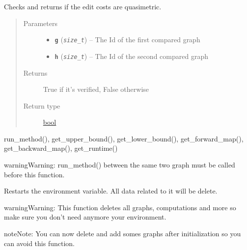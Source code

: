 \documentclass[letterpaper,10pt,english]{sphinxmanual}
\begin{document}
\begin{fulllineitems}
\label{doc:gedlibpy.quasimetric_cost}
Checks and returns if the edit costs are quasimetric.
\begin{quote}\begin{description}
\item[{Parameters}] \leavevmode\begin{itemize}
\item {} 
\textbf{\texttt{g}} (\emph{\texttt{size\_t}}) -- The Id of the first compared graph

\item {} 
\textbf{\texttt{h}} (\emph{\texttt{size\_t}}) -- The Id of the second compared graph

\end{itemize}

\item[{Returns}] \leavevmode
True if it's verified, False otherwise

\item[{Return type}] \leavevmode
\href{https://docs.python.org/3/library/functions.html\#bool}{bool}

\end{description}\end{quote}




run\_method(), get\_upper\_bound(), get\_lower\_bound(),  get\_forward\_map(), get\_backward\_map(), get\_runtime()



\begin{notice}{warning}{Warning:}
run\_method() between the same two graph must be called before this function.
\end{notice}

\end{fulllineitems}


\begin{fulllineitems}
\label{doc:gedlibpy.restart_env}
Restarts the environment variable. All data related to it will be delete.

\begin{notice}{warning}{Warning:}
This function deletes all graphs, computations and more so make sure you don't need anymore your environment.
\end{notice}

\begin{notice}{note}{Note:}
You can now delete and add somes graphs after initialization so you can avoid this function.
\end{notice}

\end{fulllineitems}
\end{document}
